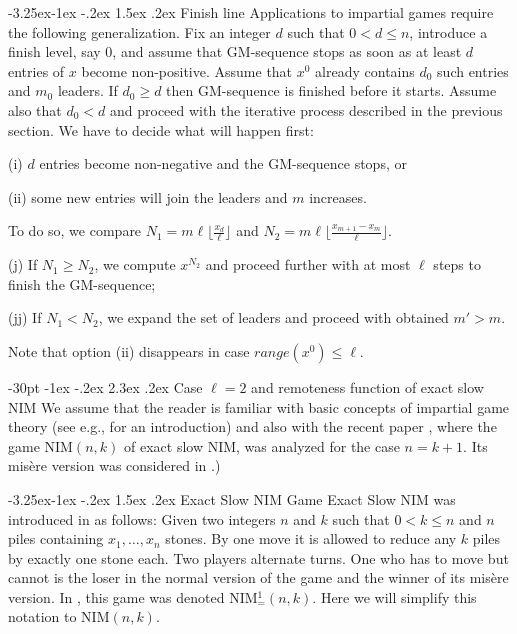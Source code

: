 \documentclass[10pt]{article}
\makeatletter
\renewcommand\section{\@startsection {section}{1}{\z@}
{-30pt \@plus -1ex \@minus -.2ex}
{2.3ex \@plus.2ex}
{\normalfont\normalsize\bfseries\boldmath}}
\renewcommand\subsection{\@startsection{subsection}{2}{\z@}
{-3.25ex\@plus -1ex \@minus -.2ex}
{1.5ex \@plus .2ex}
{\normalfont\normalsize\bfseries\boldmath}}
\theoremstyle{definition}
\makeatother
\begin{document}
\subsection{Finish line}
Applications to impartial games 
require the following generalization. 
Fix an integer  $d$  such that $0 < d \leq n$,   
introduce a finish level, say 0, and assume that 
GM-sequence stops as soon as 
at least  $d$  entries of  $x$  become non-positive. 
Assume that $x^0$ already contains 
$d_0$ such entries and $m_0$ leaders. 
If $d_0 \geq d$ then GM-sequence is finished before it starts. 
Assume also that  $d_0 < d$  and proceed with the 
iterative process described in the previous section. 
We have to decide what will happen first: 

(i) $d$  entries become non-negative 
and the GM-sequence stops, or 

(ii) some new entries will join the leaders and $m$ increases. 

To do so, we compare 
$N_1 = m \ell \lfloor \frac{x_d}{\ell} \rfloor$ and 
$N_2 = m \ell \lfloor \frac{x_{m+1} - x_m}{\ell} \rfloor$. 

(j) If $N_1 \geq N_2$, we compute $x^{N_2}$ 
and proceed further with at most $\ell$  steps to finish 
the GM-sequence; 

(jj)  If $N_1 < N_2$, we expand the set of leaders and 
proceed with obtained  $m' > m$. 

Note that option (ii) disappears in case $range(x^0) \leq \ell$. 

\section{Case $\ell=2$ and remoteness function of exact slow NIM}
\label{s-games}
We assume that the reader is familiar 
with basic concepts of impartial game theory
(see e.g., \cite{ANW07,BCG01-04} for an introduction) 
and also with the recent paper \cite{GMMV23}, 
where the game NIM$(n,k)$ of exact slow NIM,   
was analyzed for the case  $n = k+1$.  
Its mis\`ere version was considered in \cite{GMMN23}.)

\subsection{Exact Slow NIM} 
\label{ss00}
Game Exact Slow NIM  
was introduced in \cite{GH15} as follows: 
Given two integers  $n$ and $k$  
such that  $0 < k \leq n$  and  
$n$  piles containing  $x_1, \ldots, x_n$  stones.  
By one move it is allowed to reduce any  $k$  piles 
by exactly one stone each. 
Two players alternate turns. 
One who has to move but cannot is the loser 
in the normal version of the game and 
the winner of its mis\`ere version. 
In \cite{GH15}, this game was denoted  NIM$^1_=(n,k)$.
Here we will simplify this notation to  NIM$(n,k)$.
\end{document}
